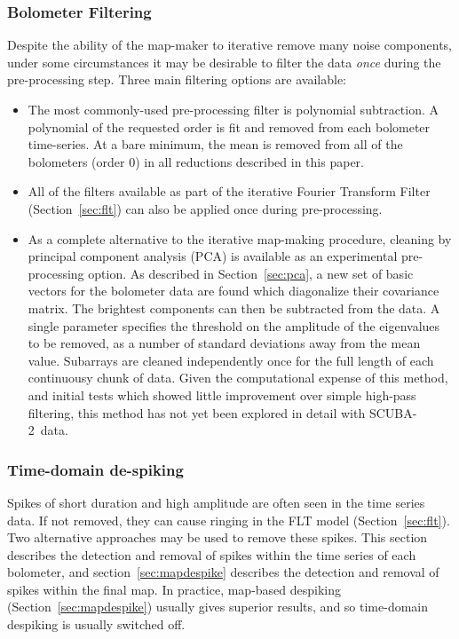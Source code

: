\documentclass[useAMS,usenatbib,nofootinbib]{mn2e}
\newcommand{\scuba}{SCUBA-2}
\begin{document}
\subsubsection{Bolometer Filtering}

Despite the ability of the map-maker to iterative remove many noise
components, under some circumstances it may be desirable to filter the
data \emph{once} during the pre-processing step. Three main filtering
options are available:

\begin{itemize}

\item The most commonly-used pre-processing filter is polynomial
subtraction. A polynomial of the requested order is fit and removed
from each bolometer time-series. At a bare minimum, the mean is
removed from all of the bolometers (order 0) in all reductions
described in this paper.

\item All of the filters available as part of the iterative Fourier
Transform Filter (Section~\ref{sec:flt}) can also be applied once
during pre-processing.

\item As a complete alternative to the iterative map-making procedure,
cleaning by principal component analysis (PCA) is available as an
experimental pre-processing option. As described in
Section~\ref{sec:pca}, a new set of basic vectors for the bolometer
data are found which diagonalize their covariance matrix. The
brightest components can then be subtracted from the data. A single
parameter specifies the threshold on the amplitude of the eigenvalues
to be removed, as a number of standard deviations away from the mean
value. Subarrays are cleaned independently once for the full length of
each continuousy chunk of data. Given the computational expense of
this method, and initial tests which showed little improvement over
simple high-pass filtering, this method has not yet been explored in
detail with \scuba\ data.

\end{itemize}


\subsubsection{Time-domain de-spiking}
\label{sec:timedespike}

Spikes of short duration and high amplitude are often seen in the time
series data. If not removed, they can cause ringing in the FLT model
(Section~\ref{sec:flt}). Two alternative approaches may be used to remove
these spikes. This section describes the detection and removal of spikes
within the time series of each bolometer, and
section~\ref{sec:mapdespike} describes the detection and removal of
spikes within the final map. In practice, map-based despiking
(Section~\ref{sec:mapdespike}) usually gives superior results, and so
time-domain despiking is usually switched off.
\end{document}
